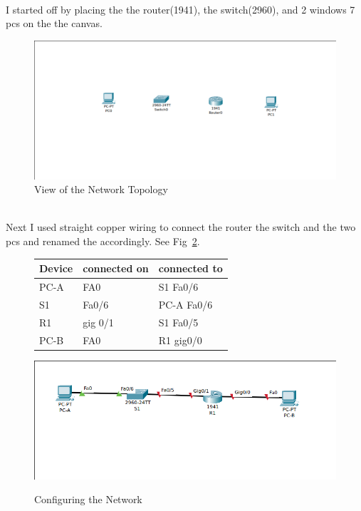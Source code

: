 \documentclass[../EngineeringJournal_CDavis.tex]{subfiles}
\begin{document}
\newpage


\\
I started off by placing the the router(1941), the switch(2960), and 2 windows 7 pcs on the the canvas.


\begin{figure}[!hbt]
  \centering
  \includegraphics[width=.45\linewidth]{Figures/2020-01-28-090220_966x444_scrot.png}
  \caption{View of the Network Topology}\label{Topo1}
\end{figure}

\noindent{}\\
Next I used straight copper wiring to connect the router the switch and the two pcs
and renamed the accordingly. See Fig~\ref{netconfig1}.

\begin{figure}[!hbt]
  \begin{minipage}[c]{0.4\linewidth}
    \centering
    \begin{tabular}{|l|l|l|}
        Device & connected on & connected to \\
        \hline
        PC-A & FA0 & S1 Fa0/6 \\
        S1 & Fa0/6 & PC-A Fa0/6 \\
        R1 & gig 0/1 & S1 Fa0/5 \\
        PC-B & FA0 & R1 gig0/0 
    \end{tabular}
    \label{netconfig1table1}
  \end{minipage}\hfill
  \begin{minipage}[c]{0.4\linewidth}
    \centering
    \includegraphics[scale=0.3]{Figures/2020-01-28-092436_700x276_scrot.png}
    \label{netconfig1scrot1}
  \end{minipage}
  \caption{Configuring the Network}\label{netconfig1}
\end{figure}
\end{document}
